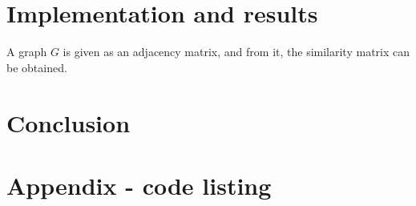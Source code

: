 \documentclass[12pt,a4paper]{article}
\begin{document}
\section{Implementation and results}

A graph $ G $ is given as an adjacency matrix, and from it, the
similarity matrix can be obtained.

\section{Conclusion}




\nocite{*}

\appendix
\section{Appendix - code listing}

\inputminted[label=main.py]{python}{../src/main.py}
\hfill
\inputminted[label=measures.py]{python}{../src/measures.py}
\hfill
\inputminted[label=slink.py]{python}{../src/slink.py}
\hfill
\inputminted[label=clink.py]{python}{../src/clink.py}
\hfill
\inputminted[label=plot.py]{python}{../src/plot.py}

\end{document}
